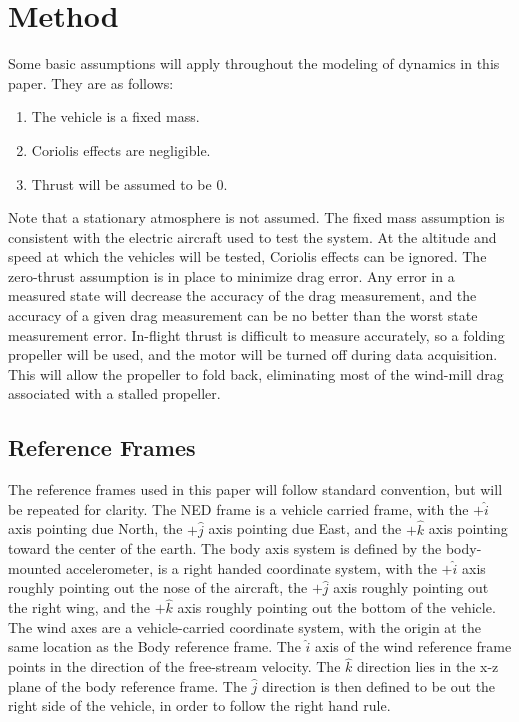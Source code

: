 \section{Method}
\label{background-information}
Some basic assumptions will apply throughout the modeling of dynamics in this paper. They are as follows:
\begin{enumerate}
\item The vehicle is a fixed mass.
\item Coriolis effects are negligible.
\item Thrust will be assumed to be 0.
\end{enumerate}
Note that a stationary atmosphere is not assumed. The fixed mass assumption is consistent with the electric aircraft used to test the system. At the altitude and speed at which the vehicles will be tested, Coriolis effects can be ignored\cite{klein2006aircraft}. The zero-thrust assumption is in place to minimize drag error. Any error in a measured state will decrease the accuracy of the drag measurement, and the accuracy of a given drag measurement can be no better than the worst state measurement error. In-flight thrust is difficult to measure accurately, so a folding propeller will be used, and the motor will be turned off during data acquisition. This will allow the propeller to fold back, eliminating most of the wind-mill drag associated with a stalled propeller. 

\subsection*{Reference Frames}
The reference frames used in this paper will follow standard convention\cite{klein2006aircraft}, but will be repeated for clarity. The NED frame is a vehicle carried frame, with the $+\hat{i}$ axis pointing due North, the $+\hat{j}$ axis pointing due East, and the $+\hat{k}$ axis pointing toward the center of the earth. The body axis system is defined by the body-mounted accelerometer, is a right handed coordinate system, with the $+\hat{i}$ axis roughly pointing out the nose of the aircraft, the $+\hat{j}$ axis roughly pointing out the right wing, and the $+\hat{k}$ axis roughly pointing out the bottom of the vehicle. The wind axes are a vehicle-carried coordinate system, with the origin at the same location as the Body reference frame. The $\hat{i}$ axis of the wind reference frame points in the direction of the free-stream velocity. The $\hat{k}$ direction lies in the x-z plane of the body reference frame. The $\hat{j}$ direction is then defined to be out the right side of the vehicle, in order to follow the right hand rule. 

